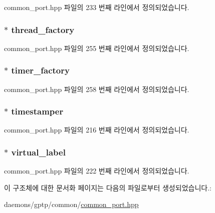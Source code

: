 common\+\_\+port.\+hpp 파일의 233 번째 라인에서 정의되었습니다.

\subsubsection[{\texorpdfstring{thread\+\_\+factory}{thread_factory}}]{$\ast$ thread\+\_\+factory}\hypertarget{struct_port_init__t_ab7b7aac8859366c067298afbdd810722}{}\label{struct_port_init__t_ab7b7aac8859366c067298afbdd810722}


common\+\_\+port.\+hpp 파일의 255 번째 라인에서 정의되었습니다.

\subsubsection[{\texorpdfstring{timer\+\_\+factory}{timer_factory}}]{$\ast$ timer\+\_\+factory}\hypertarget{struct_port_init__t_a985e15d90d12d2c643111f32fa01e07a}{}\label{struct_port_init__t_a985e15d90d12d2c643111f32fa01e07a}


common\+\_\+port.\+hpp 파일의 258 번째 라인에서 정의되었습니다.

\subsubsection[{\texorpdfstring{timestamper}{timestamper}}]{$\ast$ timestamper}\hypertarget{struct_port_init__t_ae8d86c3dced7beda53b1d1e7db68c002}{}\label{struct_port_init__t_ae8d86c3dced7beda53b1d1e7db68c002}


common\+\_\+port.\+hpp 파일의 216 번째 라인에서 정의되었습니다.

\subsubsection[{\texorpdfstring{virtual\+\_\+label}{virtual_label}}]{$\ast$ virtual\+\_\+label}\hypertarget{struct_port_init__t_aedf025e9256d121930ae0efe94d45e5e}{}\label{struct_port_init__t_aedf025e9256d121930ae0efe94d45e5e}


common\+\_\+port.\+hpp 파일의 222 번째 라인에서 정의되었습니다.



이 구조체에 대한 문서화 페이지는 다음의 파일로부터 생성되었습니다.\+:\begin{DoxyCompactItemize}
\item 
daemons/gptp/common/\hyperlink{common__port_8hpp}{common\+\_\+port.\+hpp}\end{DoxyCompactItemize}
